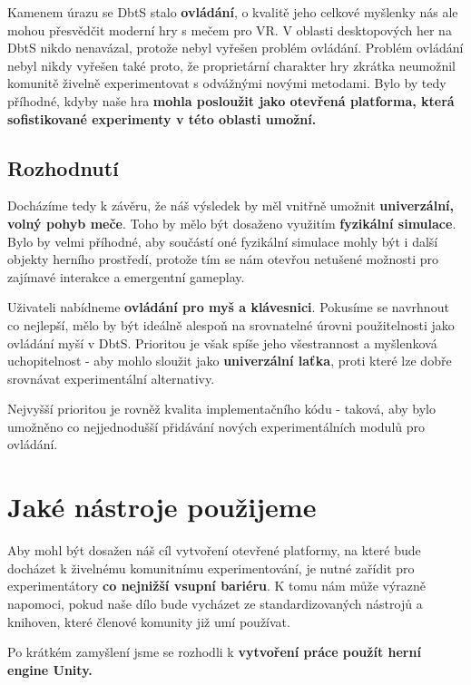 Kamenem úrazu se \acl{DbtS} stalo \textbf{ovládání}, o kvalitě jeho celkové myšlenky nás ale mohou přesvědčit moderní hry s mečem pro VR. V oblasti desktopových her na \acl{DbtS} nikdo nenavázal, protože nebyl vyřešen problém ovládání. Problém ovládání nebyl nikdy vyřešen také proto, že proprietární charakter hry zkrátka neumožnil komunitě živelně experimentovat s odvážnými novými metodami. Bylo by tedy příhodné, kdyby naše hra \textbf{mohla posloužit jako otevřená platforma, která sofistikované experimenty v této oblasti umožní.} 

\subsection{Rozhodnutí}

Docházíme tedy k závěru, že náš výsledek by měl vnitřně umožnit \textbf{univerzální, volný pohyb meče}. Toho by mělo být dosaženo využitím \textbf{fyzikální simulace}. Bylo by velmi příhodné, aby součástí oné fyzikální simulace mohly být i další objekty herního prostředí, protože tím se nám otevřou netušené možnosti pro zajímavé interakce a emergentní gameplay.

Uživateli nabídneme \textbf{ovládání pro myš a klávesnici}. Pokusíme se navrhnout co nejlepší, mělo by být ideálně alespoň na srovnatelné úrovni použitelnosti jako ovládání myší v \acs{DbtS}. Prioritou je však spíše jeho všestrannost a myšlenková uchopitelnost - aby mohlo sloužit jako \textbf{univerzální laťka}, proti které lze dobře srovnávat experimentální alternativy. 

Nejvyšší prioritou je rovněž kvalita implementačního kódu - taková, aby bylo umožněno co nejjednodušší přidávání nových experimentálních modulů pro ovládání.

\section{Jaké nástroje použijeme}

Aby mohl být dosažen náš cíl vytvoření otevřené platformy, na které bude docházet k živelnému komunitnímu experimentování, je nutné zařídit pro experimentátory \textbf{co nejnižší vsupní bariéru}. K tomu nám může výrazně napomoci, pokud naše dílo bude vycházet ze standardizovaných nástrojů a knihoven, které členové komunity již umí používat.

Po krátkém zamyšlení jsme se rozhodli k \textbf{vytvoření práce použít herní engine Unity.} 

